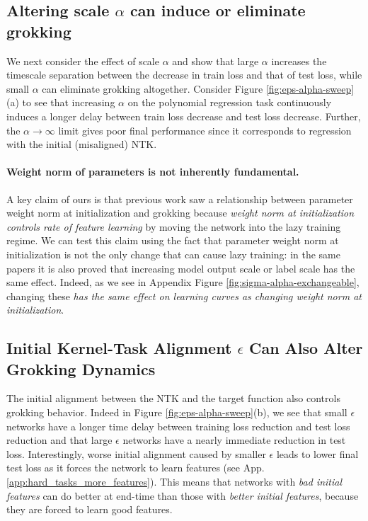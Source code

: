 \documentclass{article} %
\begin{document}
\subsection{Altering scale $\alpha$ can induce or eliminate grokking}

We next consider the effect of scale $\alpha$ and show that large $\alpha$ increases the timescale separation between the decrease in train loss and that of test loss, while small $\alpha$ can eliminate grokking altogether. Consider Figure \ref{fig:eps-alpha-sweep}(a) to see that increasing $\alpha$ on the polynomial regression task continuously induces a longer delay between train loss decrease and test loss decrease. Further, the $\alpha \to \infty$ limit gives poor final performance since it corresponds to regression with the initial (misaligned) NTK.

\paragraph{Weight norm of parameters is not inherently fundamental.}  A key claim of ours is that previous work \cite{liu2022omnigrok, varma2023explaining} saw a relationship between parameter weight norm at initialization and grokking because \textit{weight norm at initialization controls rate of feature learning} by moving the network into the lazy training regime. We can test this claim using the fact that parameter weight norm at initialization is not the only change that can cause lazy training: in the same papers \citep{chizat2019lazy, lee2019wide} it is also proved that increasing model output scale or label scale has the same effect. Indeed, as we see in Appendix Figure \ref{fig:sigma-alpha-exchangeable}, changing these \textit{has the same effect on learning curves as changing weight norm at initialization}. 

\subsection{Initial Kernel-Task Alignment $\epsilon$ Can Also Alter Grokking Dynamics}

The initial alignment between the NTK and the target function also controls grokking behavior. Indeed in Figure \ref{fig:eps-alpha-sweep}(b), we see that small $\epsilon$ networks have a longer time delay between training loss reduction and test loss reduction and that large $\epsilon$ networks have a nearly immediate reduction in test loss. Interestingly, worse initial alignment caused by smaller $\epsilon$ leads to lower final test loss as it forces the network to learn features (see App. \ref{app:hard_tasks_more_features}). This means that networks with \textit{bad initial features} can do better at end-time than those with \textit{better initial features}, because they are forced to learn good features. 
\end{document}
